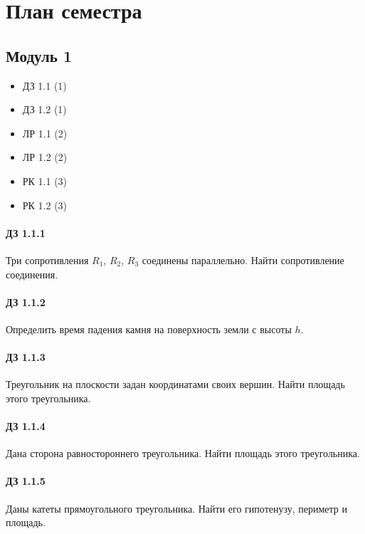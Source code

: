 \documentclass[12pt,a4paper]{report}
\begin{document}
\parindent=1cm
\pagestyle{empty}

\lstset{ language=Pascal, basicstyle=\small\ttfamily, numbers=left, numberstyle=\tiny, stepnumber=1, numbersep=5pt, extendedchars=\true, showstringspaces=false, breakatwhitespace=true, frame=single, keepspaces=true }


\clearpage
\section*{План семестра}
\subsection*{Модуль 1}
\begin{itemize}
\item ДЗ 1.1 (1)
\item ДЗ 1.2 (1)
\item ЛР 1.1 (2)
\item ЛР 1.2 (2)
\item РК 1.1 (3)
\item РК 1.2 (3)
\end{itemize}

\clearpage


\paragraph*{ДЗ 1.1.1}
Три сопротивления $R_1$, $R_2$, $R_3$ соединены параллельно. Найти сопротивление соединения.

\paragraph*{ДЗ 1.1.2}
Определить время падения камня на поверхность земли с высоты $h$.


\paragraph*{ДЗ 1.1.3}
Треугольник на плоскости задан координатами своих вершин. Найти площадь этого треугольника.

\paragraph*{ДЗ 1.1.4}
Дана сторона равностороннего треугольника. Найти площадь этого треугольника.

\paragraph*{ДЗ 1.1.5}
Даны катеты прямоугольного треугольника. Найти его гипотенузу, периметр и площадь.
\end{document}
